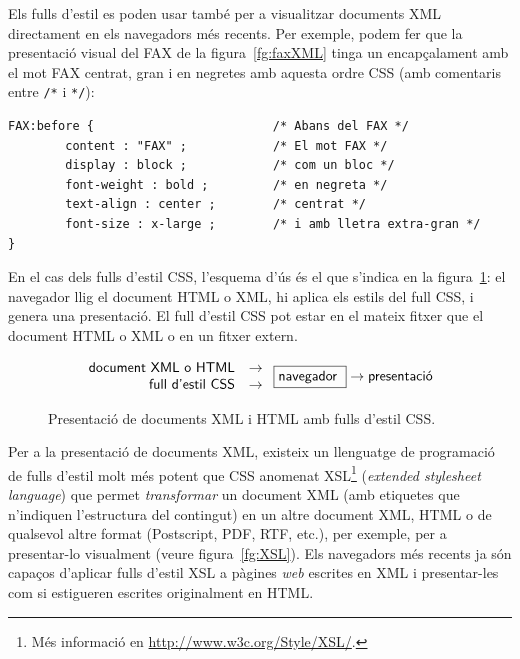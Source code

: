 Els fulls d'estil es poden usar també per a visualitzar documents XML
directament en els navegadors més recents. Per exemple, podem fer que
la presentació visual del FAX de la figura~\ref{fg:faxXML} tinga un encapçalament amb
el mot FAX centrat, gran i en negretes amb aquesta ordre CSS (amb
comentaris entre \texttt{/*} i \texttt{*/}):
\begin{verbatim}
FAX:before {                         /* Abans del FAX */
        content : "FAX" ;            /* El mot FAX */
        display : block ;            /* com un bloc */
        font-weight : bold ;         /* en negreta */
        text-align : center ;        /* centrat */
        font-size : x-large ;        /* i amb lletra extra-gran */
}
\end{verbatim}

En el cas dels fulls d'estil CSS, l'esquema d'ús és el que s'indica en
la figura~\ref{fg:CSS}: el navegador llig el document HTML o XML, hi
aplica els estils del full CSS, i genera una presentació. El full
d'estil CSS pot estar en el mateix fitxer que el document HTML o XML o
en un fitxer extern.

\begin{figure}
$$
\left.
\begin{array}{rcl}
\mbox{\textsf{document XML o HTML}} & 
\to \\
\mbox{\textsf{full d'estil CSS}} &\to 
 \\
\end{array}
\right.
\mbox{\framebox{\parbox{1.6cm}{\textsf{navegador}}}}
\to \mbox{\parbox{1.8cm}{\textsf{presentació}}}
$$
  

  \caption{Presentació de documents XML i HTML amb fulls d'estil CSS.}
  \label{fg:CSS}
\end{figure}


Per a la presentació de documents XML, existeix un llenguatge de
programació de fulls d'estil molt més potent que CSS anomenat 
XSL\footnote{Més
  informació en \url{http://www.w3c.org/Style/XSL/}.}
(\emph{extended stylesheet language}) que permet \emph{transformar} un
document XML (amb etiquetes que n'indiquen l'estructura del contingut)
en un altre document XML, HTML o de qualsevol altre format
(Postscript, PDF, RTF, etc.), per exemple, per a presentar-lo
visualment (veure figura~\ref{fg:XSL}).  
Els navegadors més recents ja
són capaços d'aplicar fulls d'estil XSL a pàgines \emph{web} escrites
en XML i presentar-les com si estigueren escrites originalment en
HTML.


